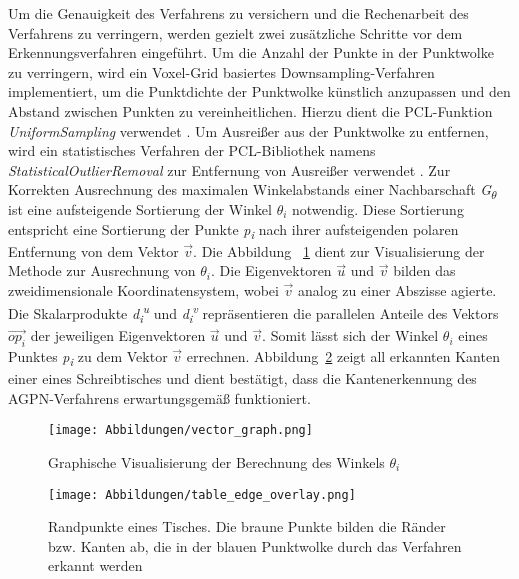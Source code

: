 Um die Genauigkeit des Verfahrens zu versichern und die Rechenarbeit des Verfahrens zu verringern, werden gezielt zwei zusätzliche Schritte vor dem Erkennungsverfahren eingeführt. Um die Anzahl der Punkte in der Punktwolke zu verringern, wird ein Voxel-Grid basiertes Downsampling-Verfahren implementiert, um die Punktdichte der Punktwolke künstlich anzupassen und den Abstand zwischen Punkten zu vereinheitlichen. Hierzu dient die PCL-Funktion \textit{UniformSampling} verwendet \autocite{noauthor_point_2023}. Um Ausreißer aus der Punktwolke zu entfernen, wird ein statistisches Verfahren der PCL-Bibliothek namens \textit{StatisticalOutlierRemoval} zur Entfernung von Ausreißer verwendet \autocite{rusu_towards_2008}. Zur Korrekten Ausrechnung des maximalen Winkelabstands einer Nachbarschaft \textit{G\textsubscript{$\theta$}} ist eine aufsteigende Sortierung der Winkel \textit{$\theta_i$} notwendig. Diese Sortierung entspricht eine Sortierung der Punkte \textit{p\textsubscript{i}} nach ihrer aufsteigenden polaren Entfernung von dem Vektor $\vec{v}$. Die Abbildung ~\ref{vector_graph} dient zur Visualisierung der Methode zur Ausrechnung von $\theta_i$. Die Eigenvektoren $\vec{u}$ und $\vec{v}$ bilden das zweidimensionale Koordinatensystem, wobei $\vec{v}$ analog zu einer Abszisse agierte. Die Skalarprodukte \textit{d\textsubscript{i}\textsuperscript{u}} und \textit{d\textsubscript{i}\textsuperscript{v}} repräsentieren die parallelen Anteile des Vektors $\vec{{op}_i}$ der jeweiligen Eigenvektoren $\vec{u}$ und $\vec{v}$. Somit lässt sich der Winkel $\theta_i$ eines Punktes \textit{p\textsubscript{i}} zu dem Vektor $\vec{v}$ errechnen. Abbildung~\ref{edge_points_table} zeigt all erkannten Kanten einer eines Schreibtisches und dient bestätigt, dass die Kantenerkennung des AGPN-Verfahrens erwartungsgemäß funktioniert.

\begin{figure}[h]
	\texttt{[image: Abbildungen/vector\_graph.png]}
	\centering
	\caption[Berechnung des Winkels zwischen Punkte]{Graphische Visualisierung der Berechnung des Winkels $\theta_i$}
	\label{vector_graph}
\end{figure}

\begin{figure}[h]
	\texttt{[image: Abbildungen/table\_edge\_overlay.png]}
	\centering
	\caption[Randpunkte eines Tisches]{Randpunkte eines Tisches. Die braune Punkte bilden die Ränder bzw. Kanten ab, die in der blauen Punktwolke durch das Verfahren erkannt werden}
	\label{edge_points_table}
\end{figure}


